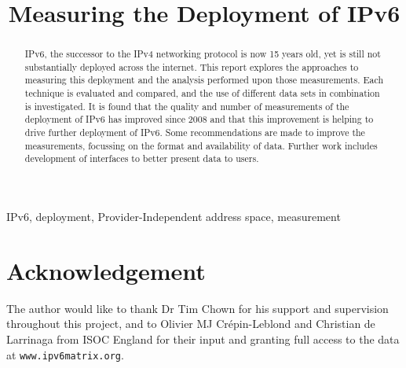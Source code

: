 \documentclass[10pt, final, conference, a4paper]{IEEEtran}
\begin{document}
\title{Measuring the Deployment of IPv6}

\author{
}



\maketitle


\begin{abstract}
IPv6, the successor to the IPv4 networking protocol is now 15 years old, yet is
still not substantially deployed across the internet. This report explores the
approaches to measuring this deployment and the analysis performed upon those
measurements. Each technique is evaluated and compared, and the use of different
data sets in combination is investigated. It is found that the quality and
number of measurements of the deployment of IPv6 has improved since 2008 and
that this improvement is helping to drive further deployment of IPv6. Some
recommendations are made to improve the measurements, focussing on the format
and availability of data. Further work includes development of interfaces to
better present data to users.
\end{abstract}

\begin{IEEEkeywords}
IPv6, deployment, Provider-Independent address space, measurement
\end{IEEEkeywords}







\section{Acknowledgement}

The author would like to thank Dr Tim Chown for his support and supervision
throughout this project, and to Olivier MJ Crépin-Leblond and Christian de
Larrinaga from ISOC England for their input and granting full access to the
data at \verb+www.ipv6matrix.org+.



{}
\end{document}
